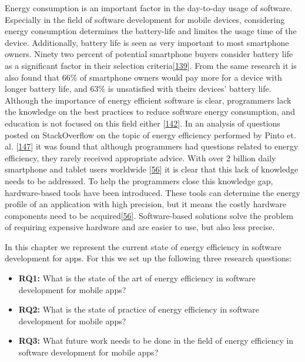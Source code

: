 \documentclass[]{book}
\providecommand{\tightlist}{%
  \setlength{\itemsep}{0pt}\setlength{\parskip}{0pt}}
\begin{document}
Energy consumption is an important factor in the day-to-day usage of
software. Especially in the field of software development for mobile
devices, considering energy consumption determines the battery-life and
limites the usage time of the device. Additionally, battery life is seen
as very important to most smartphone owners. Ninety two percent of
potential smartphone buyers consider battery life as a significant
factor in their selection
criteria{[}\protect\hyperlink{ref-OOC2017}{139}{]}. From the same
research it is also found that 66\% of smartphone owners would pay more
for a device with longer battery life, and 63\% is unsatisfied with
theirs devices' battery life. Although the importance of energy
efficient software is clear, programmers lack the knowledge on the best
practices to reduce software energy consumption, and education is not
focused on this field either {[}\protect\hyperlink{ref-PHA2016}{142}{]}.
In an analysis of questions posted on StackOverflow on the topic of
energy efficiency performed by Pinto et. al.
{[}\protect\hyperlink{ref-PCL2014}{147}{]} it was found that although
programmers had questions related to energy efficiency, they rarely
received appropriate advice. With over 2 billion daily smartphone and
tablet users worldwide {[}\protect\hyperlink{ref-NPPPZL2017}{56}{]} it
is clear that this lack of knowledge needs to be addressed. To help the
programmers close this knowledge gap, hardware-based tools have been
introduced. These tools can determine the energy profile of an
application with high precision, but it means the costly hardware
components need to be
acquired{[}\protect\hyperlink{ref-NPPPZL2017}{56}{]}. Software-based
solutions solve the problem of requiring expensive hardware and are
easier to use, but also less precise.

In this chapter we represent the current state of energy efficiency in
software development for apps. For this we set up the following three
research questions:

\begin{itemize}
\tightlist
\item
  \textbf{RQ1:} What is the state of the art of energy efficiency in
  software development for mobile apps?
\item
  \textbf{RQ2:} What is the state of practice of energy efficiency in
  software development for mobile apps?
\item
  \textbf{RQ3:} What future work needs to be done in the field of energy
  efficiency in software development for mobile apps?
\end{itemize}
\end{document}
